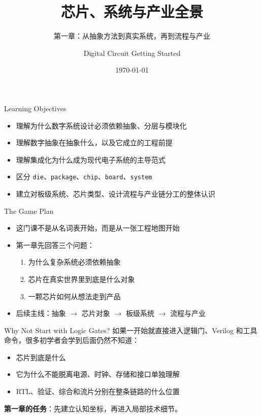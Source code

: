 \documentclass[aspectratio=169]{beamer}
\title{芯片、系统与产业全景}
\subtitle{第一章：从抽象方法到真实系统，再到流程与产业}
\author{Digital Circuit Getting Started}
\date{\today}
\begin{document}
\begin{frame}
  \titlepage
\end{frame}

\begin{frame}{Learning Objectives}
\begin{itemize}
  \item 理解为什么数字系统设计必须依赖抽象、分层与模块化
  \item 理解数字抽象在抽象什么，以及它成立的工程前提
  \item 理解集成化为什么成为现代电子系统的主导范式
  \item 区分 \texttt{die}、\texttt{package}、\texttt{chip}、\texttt{board}、\texttt{system}
  \item 建立对板级系统、芯片类型、设计流程与产业链分工的整体认识
\end{itemize}
\end{frame}

\begin{frame}{The Game Plan}
\begin{itemize}
  \item 这门课不是从名词表开始，而是从一张工程地图开始
  \item 第一章先回答三个问题：
  \begin{enumerate}
    \item 为什么复杂系统必须依赖抽象
    \item 芯片在真实世界里到底是什么对象
    \item 一颗芯片如何从想法走到产品
  \end{enumerate}
  \item 后续主线：抽象 $\rightarrow$ 芯片对象 $\rightarrow$ 板级系统 $\rightarrow$ 流程与产业
\end{itemize}
\end{frame}

\begin{frame}{Why Not Start with Logic Gates?}
\small
如果一开始就直接进入逻辑门、Verilog 和工具命令，很多初学者会学到后面仍然不知道：

\vspace{0.5em}
\begin{itemize}
  \item 芯片到底是什么
  \item 它为什么不能脱离电源、时钟、存储和接口单独理解
  \item RTL、验证、综合和流片分别在整条链路的什么位置
\end{itemize}

\vspace{0.7em}
\textbf{第一章的任务}：先建立认知坐标，再进入局部技术细节。
\end{frame}
\end{document}
